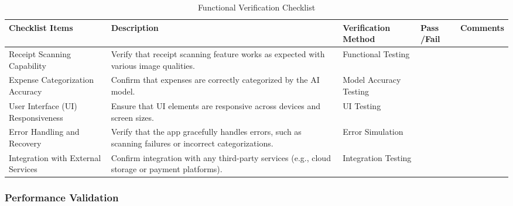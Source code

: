 \documentclass[12pt, titlepage]{article}
\begin{document}
\begin{table}[h!]
	\caption{Functional Verification Checklist}
\noindent \begin{tabular}{|>{\raggedright\arraybackslash}p{3cm}|>{\raggedright\arraybackslash}p{4cm}|>{\raggedright\arraybackslash}p{3cm}|p{1cm}|p{2.25cm}|}
	\hline
	\textbf{Checklist Items} & \textbf{Description} & \textbf{Verification Method} & \textbf{Pass /Fail} & \textbf{Comments} \\ 
	\hline
	Receipt Scanning Capability	& Verify that receipt scanning feature works as expected with various image qualities. & Functional Testing	& & \\
	\hline
	Expense Categorization Accuracy	& Confirm that expenses are correctly categorized by the AI model. & Model Accuracy Testing	& & \\
	\hline
	User Interface (UI) Responsiveness & Ensure that UI elements are responsive across devices and screen sizes. & UI Testing & & \\
	\hline
	Error Handling and Recovery	& Verify that the app gracefully handles errors, such as scanning failures or incorrect categorizations. & Error Simulation	& & \\
	\hline
	Integration with External Services & Confirm integration with any third-party services (e.g., cloud storage or payment platforms). & Integration Testing & & \\
	\hline
\end{tabular}
\end{table}

\newpage

\subsubsection{Performance Validation}
\end{document}
